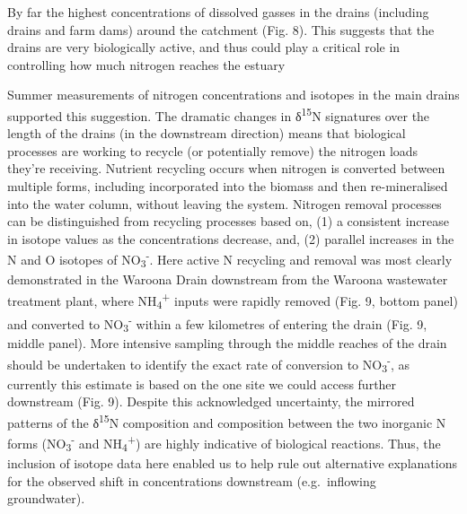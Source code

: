 \documentclass[
]{book}
\begin{document}
By far the highest concentrations of dissolved gasses in the drains (including drains and farm dams) around the catchment (Fig. 8). This suggests that the drains are very biologically active, and thus could play a critical role in controlling how much nitrogen reaches the estuary

Summer measurements of nitrogen concentrations and isotopes in the main drains supported this suggestion. The dramatic changes in δ\textsuperscript{15}N signatures over the length of the drains (in the downstream direction) means that biological processes are working to recycle (or potentially remove) the nitrogen loads they're receiving. Nutrient recycling occurs when nitrogen is converted between multiple forms, including incorporated into the biomass and then re-mineralised into the water column, without leaving the system. Nitrogen removal processes can be distinguished from recycling processes based on, (1) a consistent increase in isotope values as the concentrations decrease, and, (2) parallel increases in the N and O isotopes of NO\textsubscript{3}\textsuperscript{-}. Here active N recycling and removal was most clearly demonstrated in the Waroona Drain downstream from the Waroona wastewater treatment plant, where NH\textsubscript{4}\textsuperscript{+} inputs were rapidly removed (Fig. 9, bottom panel) and converted to NO\textsubscript{3}\textsuperscript{-} within a few kilometres of entering the drain (Fig. 9, middle panel). More intensive sampling through the middle reaches of the drain should be undertaken to identify the exact rate of conversion to NO\textsubscript{3}\textsuperscript{-}, as currently this estimate is based on the one site we could access further downstream (Fig. 9). Despite this acknowledged uncertainty, the mirrored patterns of the δ\textsuperscript{15}N composition and composition between the two inorganic N forms (NO\textsubscript{3}\textsuperscript{-} and NH\textsubscript{4}\textsuperscript{+}) are highly indicative of biological reactions. Thus, the inclusion of isotope data here enabled us to help rule out alternative explanations for the observed shift in concentrations downstream (e.g.~inflowing groundwater).~
\end{document}
